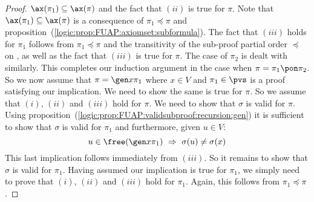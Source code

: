 \begin{proof}
$\ax(\pi_{1})\subseteq\ax(\pi)$ and the fact that $(ii)$ is true for
$\pi$. Note that $\ax(\pi_{1})\subseteq\ax(\pi)$ is a consequence of
$\pi_{1}\preceq\pi$ and
proposition~(\ref{logic:prop:FUAP:axiomset:subformula}). The fact
that $(iii)$ holds for $\pi_{1}$ follows from $\pi_{1}\preceq\pi$
and the transitivity of the sub-proof partial order $\preceq$ on
\pvs, as well as the fact that $(iii)$ is true for $\pi$. The case
of $\pi_{2}$ is dealt with similarly. This completes our induction
argument in the case when $\pi=\pi_{1}\pon\pi_{2}$. So we now assume
that $\pi=\gen x\pi_{1}$ where $x\in V$ and $\pi_{1}\in\pvs$ is a
proof satisfying our implication. We need to show the same is true
for $\pi$. So we assume that $(i)$, $(ii)$ and $(iii)$ hold for
$\pi$. We need to show that $\sigma$ is valid for $\pi$. Using
proposition~(\ref{logic:prop:FUAP:validsubproof:recursion:gen}) it
is sufficient to show that $\sigma$ is valid for $\pi_{1}$ and
furthermore, given $u\in V$:
    \[
    u\in\free(\gen x\pi_{1})\ \Rightarrow\
    \sigma(u)\neq\sigma(x)
    \]
This last implication follows immediately from $(iii)$. So it
remains to show that $\sigma$ is valid for $\pi_{1}$. Having assumed
our implication is true for $\pi_{1}$, we simply need to prove that
$(i)$, $(ii)$ and $(iii)$ hold for $\pi_{1}$. Again, this follows
from $\pi_{1}\preceq\pi$.
\end{proof}

